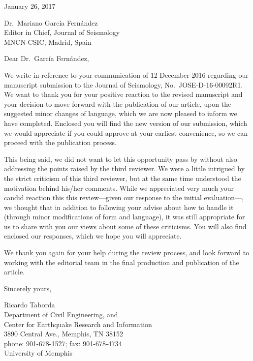 \documentclass{article}
\begin{document}
\setlength{\parindent}{0ex}

January 26, 2017
\vspace{12ex}

Dr.~Mariano Garc\'{i}a Fern\'{a}ndez\\
Editor in Chief, Journal of Seismology\\
MNCN-CSIC, Madrid, Spain
\vspace{8ex}

\setlength{\parskip}{2ex}

Dear Dr.~Garc\'{i}a Fern\'{a}ndez,

We write in reference to your communication of 12 December 2016 regarding our manuscript submission to the Journal of Seismology, No.~JOSE-D-16-00092R1. We want to thank you for your positive reaction to the revised manuscript and your decision to move forward with the publication of our article, upon the suggested minor changes of language, which we are now pleased to inform we have completed. Enclosed you will find the new version of our submission, which we would appreciate if you could approve at your earliest convenience, so we can proceed with the publication process.

This being said, we did not want to let this opportunity pass by without also addressing the points raised by the third reviewer. We were a little intrigued by the strict criticism of this third reviewer, but at the same time understood the motivation behind his/her comments. While we appreciated very much your candid reaction this this review---given our response to the initial evaluation---, we thought that in addition to following your advise about how to handle it (through minor modifications of form and language), it was still appropriate for us to share with you our views about some of these criticisms. You will also find enclosed our responses, which we hope you will appreciate.

We thank you again for your help during the review process, and look forward to working with the editorial team in the final production and publication of the article.

\vspace{5ex}
Sincerely yours,
\vspace{10ex}

Ricardo Taborda\\
Department of Civil Engineering, and\\
Center for Earthquake Research and Information\\
3890 Central Ave., Memphis, TN 38152\\
phone: 901-678-1527; fax: 901-678-4734\\
University of Memphis
\end{document}
